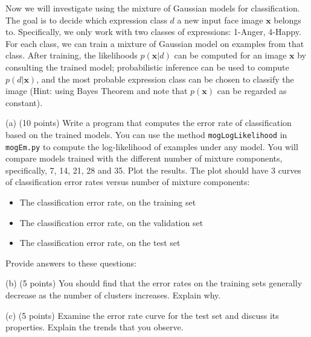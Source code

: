 \documentclass[12pt]{article}
\newcommand{\xx}{\mathbf{x}}
\begin{document}
Now we will investigate using the mixture of Gaussian models for classification. The goal is to decide which expression class $d$ a new input face image $\xx$ belongs to. Specifically, we only work with two classes of expressions: 1-Anger, 4-Happy. For each class, we can train a mixture of Gaussian model on examples from that class. After training, the likelihoods $p(\xx|d)$ can be computed for an image $\xx$ by consulting the trained model; probabilistic inference can be used to compute $p(d|\xx)$, and the most probable expression class can be chosen to classify the image (Hint: using Bayes Theorem and note that $p(\xx)$ can be regarded as constant).

(a) (10 points) Write a program that computes the error rate of classification based on the trained models. You can use the method {\tt mogLogLikelihood} in {\tt mogEm.py} to compute the log-likelihood of examples under any model. You will compare models trained with the different number of mixture components, specifically, 7, 14, 21, 28 and 35. Plot the results. The plot should have 3 curves of classification error rates versus number of mixture components:

\begin{itemize}
\item The classification error rate, on the training set
\item The classification error rate, on the validation set
\item The classification error rate, on the test set
\end{itemize}


Provide answers to these questions:

\vspace{.1in}


(b) (5 points)  You should find that the error rates on the training sets generally
decrease as the number of clusters increases. Explain why.

\vspace{.1in}

(c) (5 points)  Examine the error rate curve for the test set and discuss its properties.
Explain the trends that you observe.

\end{document}
